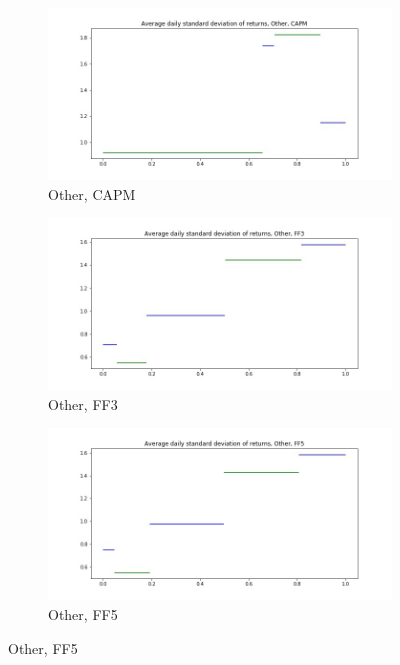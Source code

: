 \documentclass{article}
\begin{document}
 \begin{figure}
  \centering
  \begin{subfigure}[b]{0.3\textwidth}
    \centering
    \includegraphics[width=\textwidth]{Other/daily_stdevCAPM.jpg}
    \caption{Other, CAPM}
    \label{fig:1}
  \end{subfigure}
  \begin{subfigure}[b]{0.3\textwidth}
    \centering
    \includegraphics[width=\textwidth]{Other/daily_stdevFF3.jpg}
    \caption{Other, FF3}
    \label{fig:2}
  \end{subfigure}
    \begin{subfigure}[b]{0.3\textwidth}
    \centering
    \includegraphics[width=\textwidth]{Other/daily_stdevFF5.jpg}
    \caption{Other, FF5}
    \label{fig:1}
  \end{subfigure}
  \end{figure}
        
  
\end{document}
